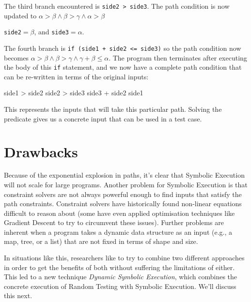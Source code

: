 The third branch encountered is {\tt side2 > side3}. The path condition is now
updated to $\alpha > \beta \wedge \beta > \gamma \wedge \alpha > \beta$

{\tt side2}$ = \beta$, and {\tt side3}$ = \alpha$.

The fourth branch is {\tt if (side1 + side2 <= side3)} so the path condition now
becomes $\alpha > \beta \wedge \beta > \gamma \wedge \gamma + \beta \leq
\alpha$. The program then terminates after executing the body of this {\tt if}
statement, and we now have a complete path condition that can be re-written in
terms of the original inputs:

side1 > side2 \wedge side2 > side3 \wedge side3 + side2 \leq side1 

This represents the inputs that will take this particular path. Solving the
predicate gives us a concrete input that can be used in a test case.

\section{Drawbacks}

Because of the exponential explosion in paths, it's clear that Symbolic
Execution will not scale for large programs. Another problem for Symbolic
Execution is that constraint solvers are not always powerful enough to find
inputs that satisfy the path constraints. Constraint solvers have historically
found non-linear equations difficult to reason about (some have even applied
optimisation techniques like Gradient Descent to try to circumvent these
issues). Further problems are inherent when a program takes a dynamic data
structure as an input (e.g., a map, tree, or a list) that are not fixed in terms
of shape and size. 

In situations like this, researchers like to try to combine two different
approaches in order to get the benefits of both without suffering the
limitations of either. This led to a new technique {\it Dynamic Symbolic
Execution}, which combines the concrete execution of Random Testing with
Symbolic Execution. We'll discuss this next.

